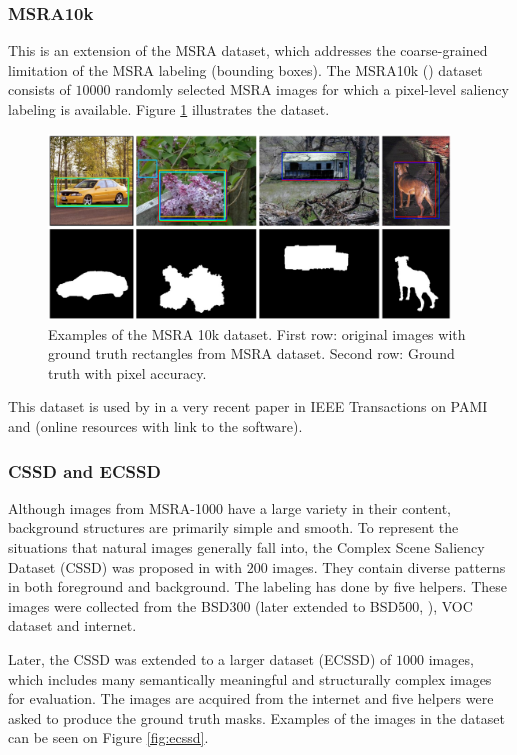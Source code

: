 \subsubsection{MSRA10k}
This is an extension of the MSRA dataset, which  addresses the coarse-grained limitation of the MSRA labeling (bounding boxes). The MSRA10k (\cite{msra10k_db}) dataset consists of $10000$ randomly selected MSRA images for which a pixel-level saliency labeling is available. Figure \ref{fig:msra10k} illustrates the dataset. 
\begin{figure}[H]
\begin{center}
\includegraphics[width=0.95\textwidth]{fig/MSRA10k}
\end{center}
\caption{Examples of the MSRA 10k dataset. First row: original images with ground truth rectangles from MSRA dataset. Second row: Ground truth with pixel accuracy.}
\label{fig:msra10k}
\end{figure}
This dataset is used by in a very recent paper in IEEE Transactions on PAMI \cite{ChengPAMI2015} and \cite{chengPAMIUrl} (online resources with link to the software). 

\subsubsection{CSSD and ECSSD}
Although images from MSRA-1000 \cite{LCAV-CONF-2009-012} have a large variety in their content, background structures are primarily simple and smooth. To represent the situations that natural images generally fall into, the Complex Scene Saliency Dataset (CSSD) \cite{cssd_db} was proposed in \cite{YanCVPR2013} with $200$ images. They contain diverse patterns in both foreground and background. The labeling has done by five  helpers. These images were collected from the BSD300 (later extended to BSD500, \cite{bsd300/500_db}), VOC dataset \cite{voc_db} and internet.

Later, the CSSD was extended to a larger dataset (ECSSD) of $1000$ images, which includes many semantically meaningful and structurally complex images for evaluation. The images are acquired from the internet and five helpers were asked to produce the ground truth masks. Examples of the images in the dataset can be seen on Figure \ref{fig:ecssd}.

